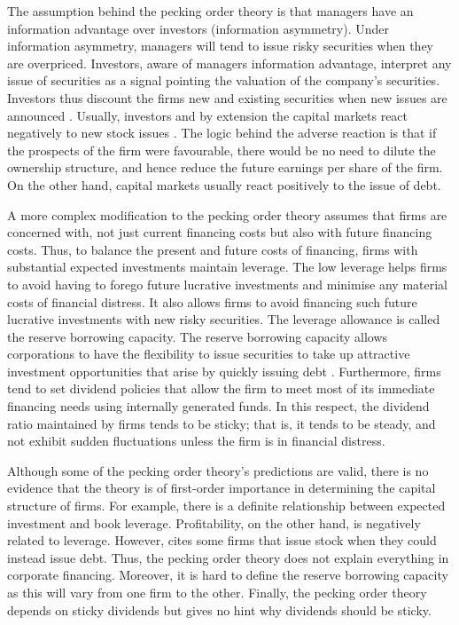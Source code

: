 \documentclass[a4paper, nobind]{templates/ociamthesis}
\begin{document}
The assumption behind the pecking order theory is that managers have an information advantage over investors (information asymmetry). Under information asymmetry, managers will tend to issue risky securities when they are overpriced. Investors, aware of managers information advantage, interpret any issue of securities as a signal pointing the valuation of the company's securities. Investors thus discount the firms new and existing securities when new issues are announced \autocite{fama2002testing}. Usually, investors and by extension the capital markets react negatively to new stock issues \autocite{myers1984capital,chirinko2000testing}. The logic behind the adverse reaction is that if the prospects of the firm were favourable, there would be no need to dilute the ownership structure, and hence reduce the future earnings per share of the firm. On the other hand, capital markets usually react positively to the issue of debt.

A more complex modification to the pecking order theory assumes that firms are concerned with, not just current financing costs but also with future financing costs. Thus, to balance the present and future costs of financing, firms with substantial expected investments maintain leverage. The low leverage helps firms to avoid having to forego future lucrative investments and minimise any material costs of financial distress. It also allows firms to avoid financing such future lucrative investments with new risky securities.
The leverage allowance is called the reserve borrowing capacity. The reserve borrowing capacity allows corporations to have the flexibility to issue securities to take up attractive investment opportunities that arise by quickly issuing debt \autocite{ehrhardt2016corporate}. Furthermore, firms tend to set dividend policies that allow the firm to meet most of its immediate financing needs using internally generated funds. In this respect, the dividend ratio maintained by firms tends to be sticky; that is, it tends to be steady, and not exhibit sudden fluctuations unless the firm is in financial distress.

Although some of the pecking order theory's predictions are valid, there is no evidence that the theory is of first-order importance in determining the capital structure of firms. For example, there is a definite relationship between expected investment and book leverage. Profitability, on the other hand, is negatively related to leverage. However, \textcite{myers1984corporate} cites some firms that issue stock when they could instead issue debt. Thus, the pecking order theory does not explain everything in corporate financing.
Moreover, it is hard to define the reserve borrowing capacity as this will vary from one firm to the other. Finally, the pecking order theory depends on sticky dividends but gives no hint why dividends should be sticky.
\end{document}
